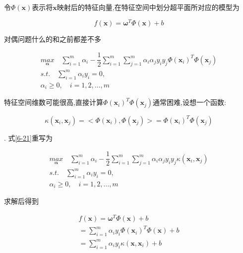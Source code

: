 \documentclass[12pt]{article}
\numberwithin{equation}{section}%
\begin{document}
令$\Phi(\boldsymbol{x})$表示将$\boldsymbol{x}$映射后的特征向量,在特征空间中划分超平面所对应的模型为

\begin{equation}
f(\boldsymbol{x})=\boldsymbol{\omega}^{T}\Phi(\boldsymbol{x})+b
\end{equation}

对偶问题什么的和之前都差不多

\begin{equation}
\begin{split} 
{\underset{\boldsymbol{\alpha}}{max}} \quad  \sum_{i=1}^{m}\alpha_{i}-\dfrac{1}{2}\sum_{i=1}^{m}\sum_{j=1}^{m}\alpha_{i}\alpha_{j}y_{i}y_{j}\Phi(\boldsymbol{x}_{i})^{T}\Phi(\boldsymbol{x}_{j})  \\
s.t. \quad \sum_{i=1}^{m}\alpha_{i}y_{i} = 0,  \\
\alpha_{i} \geqslant 0, \quad i=1,2, \ldots, m 
\end{split}
\label{6-21}
\end{equation}

特征空间维数可能很高,直接计算$\Phi(\boldsymbol{x}_{i})^{T}\Phi(\boldsymbol{x}_{j}) $通常困难,设想一个函数:

\begin{equation}
\kappa(\boldsymbol{x}_{i},\boldsymbol{x}_{j})=<\Phi(\boldsymbol{x}_{i}),\Phi(\boldsymbol{x}_{j}) >=\Phi(\boldsymbol{x}_{i})^{T}\Phi(\boldsymbol{x}_{j}) 
\end{equation}

{}. 式\ref{6-21}重写为

\begin{equation}
\begin{split} 
{\underset{\boldsymbol{\alpha}}{max}} \quad  \sum_{i=1}^{m}\alpha_{i}-\dfrac{1}{2}\sum_{i=1}^{m}\sum_{j=1}^{m}\alpha_{i}\alpha_{j}y_{i}y_{j}\kappa(\boldsymbol{x}_{i},\boldsymbol{x}_{j})  \\
s.t. \quad \sum_{i=1}^{m}\alpha_{i}y_{i} = 0,  \\
\alpha_{i} \geqslant 0, \quad i=1,2, \ldots, m 
\end{split}
\label{6-23}
\end{equation}

求解后得到

\begin{equation}
\begin{split} 
f(\boldsymbol{x})=\boldsymbol{\omega}^{T}\Phi(\boldsymbol{x})+b \\
= \sum_{i=1}^{m}\alpha_{i}y_{i}\Phi(\boldsymbol{x}_{i})^{T}\Phi(\boldsymbol{x})+b  \\
=\sum_{i=1}^{m}\alpha_{i}y_{i}\kappa(\boldsymbol{x},\boldsymbol{x}_{i})+b
\end{split} 
\label{6-24}
\end{equation}
\end{document}
